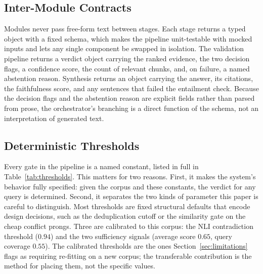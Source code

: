 \documentclass[conference]{IEEEtran}
\begin{document}
\subsection{Inter-Module Contracts}
Modules never pass free-form text between stages. Each stage returns a
typed object with a fixed schema, which makes the pipeline unit-testable
with mocked inputs and lets any single component be swapped in isolation.
The validation pipeline returns a verdict object carrying the ranked
evidence, the two decision flags, a confidence score, the count of
relevant chunks, and, on failure, a named abstention reason. Synthesis
returns an object carrying the answer, its citations, the faithfulness
score, and any sentences that failed the entailment check. Because the
decision flags and the abstention reason are explicit fields rather than
parsed from prose, the orchestrator's branching is a direct function of the
schema, not an interpretation of generated text.

\subsection{Deterministic Thresholds}
Every gate in the pipeline is a named constant, listed in full in
Table~\ref{tab:thresholds}. This matters for two reasons. First, it makes
the system's behavior fully specified: given the corpus and these
constants, the verdict for any query is determined. Second, it separates
the two kinds of parameter this paper is careful to distinguish. Most
thresholds are fixed structural defaults that encode design decisions, such
as the deduplication cutoff or the similarity gate on the cheap conflict
prongs. Three are calibrated to this corpus: the NLI contradiction
threshold ($0.94$) and the two sufficiency signals (average score $0.65$,
query coverage $0.55$). The calibrated thresholds are the ones
Section~\ref{sec:limitations} flags as requiring re-fitting on a new
corpus; the transferable contribution is the method for placing them, not
the specific values.
\end{document}
